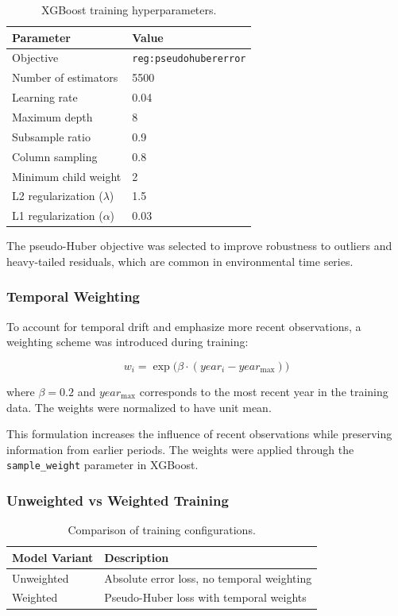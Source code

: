 \begin{table}[H]
\centering
\begin{tabular}{ll}
\toprule
\textbf{Parameter} & \textbf{Value} \\
\midrule
Objective & \texttt{reg:pseudohubererror} \\
Number of estimators & 5500 \\
Learning rate & 0.04 \\
Maximum depth & 8 \\
Subsample ratio & 0.9 \\
Column sampling & 0.8 \\
Minimum child weight & 2 \\
L2 regularization ($\lambda$) & 1.5 \\
L1 regularization ($\alpha$) & 0.03 \\
\bottomrule
\end{tabular}
\caption{XGBoost training hyperparameters.}
\end{table}

The pseudo-Huber objective was selected to improve robustness to outliers and heavy-tailed residuals, which are common in environmental time series.

\subsubsection*{Temporal Weighting}
To account for temporal drift and emphasize more recent observations, a weighting scheme was introduced during training:

\begin{equation}
w_i = \exp\big(\beta \cdot (year_i - year_{\max})\big)
\label{eq:temporal_weight}
\end{equation}

where $\beta = 0.2$ and $year_{\max}$ corresponds to the most recent year in the training data. The weights were normalized to have unit mean.

This formulation increases the influence of recent observations while preserving information from earlier periods. The weights were applied through the \texttt{sample\_weight} parameter in XGBoost.

\subsubsection*{Unweighted vs Weighted Training}

\begin{table}[H]
\centering
\begin{tabular}{ll}
\toprule
\textbf{Model Variant} & \textbf{Description} \\
\midrule
Unweighted & Absolute error loss, no temporal weighting \\
Weighted & Pseudo-Huber loss with temporal weights \\
\bottomrule
\end{tabular}
\caption{Comparison of training configurations.}
\end{table}

